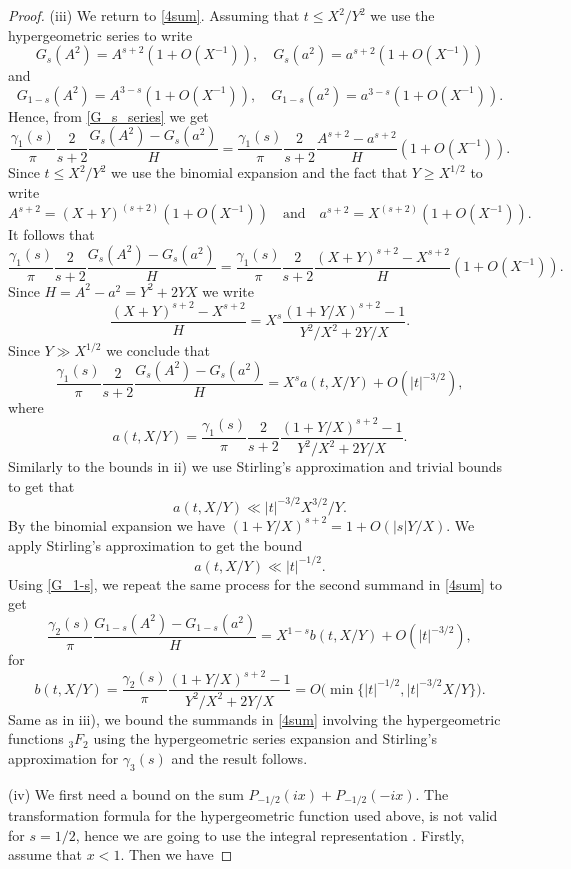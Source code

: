 \documentclass[a4paper,11pt]{amsart}
\theoremstyle{definition}
\begin{document}
\begin{proof}
(iii) We return to \eqref{4sum}. Assuming that $t\le X^2/Y^2$ we use the hypergeometric series to write
\begin{equation}\label{G_s_series}
    G_s(A^2)=A^{s+2}(1+O(X^{-1})) , \quad G_{s}(a^2)=a^{s+2}(1+O(X^{-1}))
\end{equation}
and 
\begin{equation}\label{G_1-s}
    G_{1-s}(A^2)=A^{3-s}(1+O(X^{-1})), \quad G_{1-s}(a^2)=a^{3-s}(1+O(X^{-1})).
\end{equation}
Hence, from \eqref{G_s_series} we get $$\frac{\gamma_1(s)}{\pi}\frac{2}{s+2}\frac{G_s(A^2)-G_s(a^2)}{H}=\frac{\gamma_1(s)}{\pi}\frac{2}{s+2}\frac{A^{s+2}-a^{s+2}}{H}(1+O(X^{-1})).$$
Since $t\le X^2/Y^2$ we use the binomial expansion and the fact that $Y\ge X^{1/2}$ to write 
$$ A^{s+2}=(X+Y)^{(s+2)}(1+O(X^{-1})) \quad \text{and} \quad a^{s+2}=X^{(s+2)}(1+O(X^{-1})).$$
It follows that
$$\frac{\gamma_1(s)}{\pi}\frac{2}{s+2}\frac{G_s(A^2)-G_s(a^2)}{H}=\frac{\gamma_1(s)}{\pi}\frac{2}{s+2}\frac{(X+Y)^{s+2}-X^{s+2}}{H}(1+O(X^{-1})).$$
Since $H=A^2-a^2=Y^2+2YX$ we write
$$\frac{(X+Y)^{s+2}-X^{s+2}}{H}=X^s\frac{(1+Y/X)^{s+2}-1}{Y^2/X^2+2Y/X}.$$
Since $Y\gg X^{1/2}$ we conclude that 
$$\frac{\gamma_1(s)}{\pi}\frac{2}{s+2}\frac{G_s(A^2)-G_s(a^2)}{H}=X^sa(t,X/Y)+O(|t|^{-3/2}),$$
where $$a(t,X/Y)=\frac{\gamma_1(s)}{\pi}\frac{2}{s+2}\frac{(1+Y/X)^{s+2}-1}{Y^2/X^2+2Y/X}.$$
Similarly to the bounds in ii) we use Stirling's approximation and trivial bounds to get that
$$a(t,X/Y) \ll |t|^{-3/2}X^{3/2}/Y.$$
By the binomial expansion we have $(1+Y/X)^{s+2}=1+O(|s|Y/X)$. We apply Stirling's approximation to get the bound
$$a(t,X/Y) \ll |t|^{-1/2}.$$
Using \eqref{G_1-s}, we repeat the same process for the second summand in \eqref{4sum} to get
$$\frac{\gamma_2(s)}{\pi}\frac{G_{1-s}(A^2)-G_{1-s}(a^2)}{H}=X^{1-s}b(t,X/Y)+O(|t|^{-3/2}),$$
for $$b(t,X/Y)=\frac{\gamma_2(s)}{\pi}\frac{(1+Y/X)^{s+2}-1}{Y^2/X^2+2Y/X} = O\big( \min \{|t|^{-1/2},|t|^{-3/2}X/Y\}\big).$$
Same as in iii), we bound the summands in \eqref{4sum} involving the hypergeometric functions ${}_3F_2$ using the hypergeometric series expansion and Stirling's approximation for $\gamma_3(s)$ and the result follows.



(iv) We first need a bound on the sum $P_{-1/2}(ix)+P_{-1/2}(-ix)$. The transformation formula \cite[Eq. 16.8.8]{NIST} for the hypergeometric function used above, is not valid for $s=1/2$, hence we are going to use the integral representation \cite[Eq. 8.713.3]{gradshteyn2007}. Firstly, assume that $x<1$. Then we have 


\end{proof}
\end{document}

